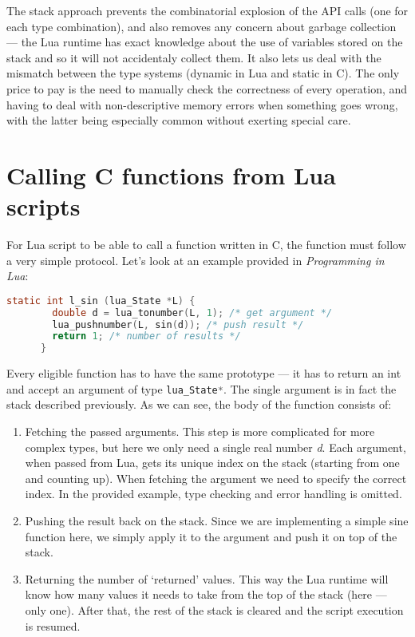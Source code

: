 \documentclass[polish, english]{iithesis}
\begin{document}
    The stack approach prevents the combinatorial explosion of the API calls (one for each type combination), and also removes any concern about garbage collection --- the Lua runtime has exact knowledge about the use of variables stored on the stack and so it will not accidentaly collect them.
    It also lets us deal with the mismatch between the type systems (dynamic in Lua and static in C).
    The only price to pay is the need to manually check the correctness of every operation, and having to deal with non-descriptive memory errors when something goes wrong, with the latter being especially common without exerting special care.
  \section{Calling C functions from Lua scripts}\label{call_c_from_lua}
    For Lua script to be able to call a function written in C, the function must follow a very simple protocol.
    Let's look at an example provided in \textit{Programming in Lua}\cite{pil4}:
    \begin{lstlisting}[caption=Example C function to be called from Lua, language=C]
      static int l_sin (lua_State *L) {
        double d = lua_tonumber(L, 1); /* get argument */
        lua_pushnumber(L, sin(d)); /* push result */
        return 1; /* number of results */
      }
    \end{lstlisting}
    Every eligible function has to have the same prototype --- it has to return an int and accept an argument of type \lstinline[language=C]|lua_State*|.
    The single argument is in fact the stack described previously.
    As we can see, the body of the function consists of:
    \begin{enumerate}
      \item Fetching the passed arguments. 
        This step is more complicated for more complex types, but here we only need a single real number \textit{d}.
        Each argument, when passed from Lua, gets its unique index on the stack (starting from one and counting up).
        When fetching the argument we need to specify the correct index.
        In the provided example, type checking and error handling is omitted.
      \item Pushing the result back on the stack.
        Since we are implementing a simple sine function here, we simply apply it to the argument and push it on top of the stack.
      \item Returning the number of `returned' values.
        This way the Lua runtime will know how many values it needs to take from the top of the stack (here --- only one).
        After that, the rest of the stack is cleared and the script execution is resumed.
    \end{enumerate}
\end{document}
